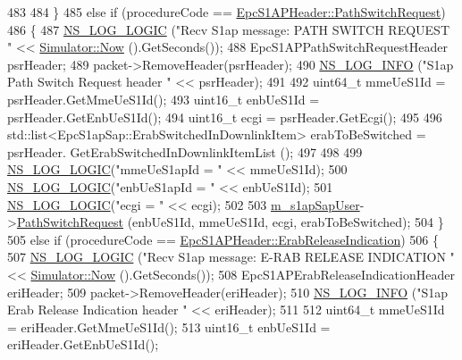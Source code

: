 \begin{DoxyCode}
483 
484   \}
485   \textcolor{keywordflow}{else} \textcolor{keywordflow}{if} (procedureCode == \hyperlink{classns3_1_1EpcS1APHeader_aedd7ba8568bf04ce8960bd840712a63eaab42fb0bc4eaa2bd39ab5195f0d6a6d8}{EpcS1APHeader::PathSwitchRequest})
486   \{
487     \hyperlink{group__logging_ga88acd260151caf2db9c0fc84997f45ce}{NS\_LOG\_LOGIC} (\textcolor{stringliteral}{"Recv S1ap message: PATH SWITCH REQUEST "} << 
      \hyperlink{classns3_1_1Simulator_ac3178fa975b419f7875e7105be122800}{Simulator::Now} ().GetSeconds());
488     EpcS1APPathSwitchRequestHeader psrHeader;
489     packet->RemoveHeader(psrHeader);
490     \hyperlink{group__logging_gafbd73ee2cf9f26b319f49086d8e860fb}{NS\_LOG\_INFO} (\textcolor{stringliteral}{"S1ap Path Switch Request header "} << psrHeader);
491     
492     uint64\_t mmeUeS1Id = psrHeader.GetMmeUeS1Id();
493     uint16\_t enbUeS1Id = psrHeader.GetEnbUeS1Id();
494     uint16\_t ecgi = psrHeader.GetEcgi();
495 
496     std::list<EpcS1apSap::ErabSwitchedInDownlinkItem> erabToBeSwitched = psrHeader.
      GetErabSwitchedInDownlinkItemList ();
497 
498 
499     \hyperlink{group__logging_ga88acd260151caf2db9c0fc84997f45ce}{NS\_LOG\_LOGIC}(\textcolor{stringliteral}{"mmeUeS1apId = "} << mmeUeS1Id);
500     \hyperlink{group__logging_ga88acd260151caf2db9c0fc84997f45ce}{NS\_LOG\_LOGIC}(\textcolor{stringliteral}{"enbUeS1apId = "} << enbUeS1Id);
501     \hyperlink{group__logging_ga88acd260151caf2db9c0fc84997f45ce}{NS\_LOG\_LOGIC}(\textcolor{stringliteral}{"ecgi = "} << ecgi);
502 
503     \hyperlink{classns3_1_1EpcS1apMme_ab9994a301789a31ce3c324f80266619b}{m\_s1apSapUser}->\hyperlink{classns3_1_1EpcS1apSapMme_ac82413022edee64f336cf3804ad6184d}{PathSwitchRequest} (enbUeS1Id, mmeUeS1Id, ecgi, 
      erabToBeSwitched);
504   \}
505   \textcolor{keywordflow}{else} \textcolor{keywordflow}{if} (procedureCode == \hyperlink{classns3_1_1EpcS1APHeader_aedd7ba8568bf04ce8960bd840712a63eacba9fcdd89b080f9511a1de3dea78cf0}{EpcS1APHeader::ErabReleaseIndication})
506   \{
507    \hyperlink{group__logging_ga88acd260151caf2db9c0fc84997f45ce}{NS\_LOG\_LOGIC} (\textcolor{stringliteral}{"Recv S1ap message: E-RAB RELEASE INDICATION "} << 
      \hyperlink{classns3_1_1Simulator_ac3178fa975b419f7875e7105be122800}{Simulator::Now} ().GetSeconds());
508     EpcS1APErabReleaseIndicationHeader eriHeader;
509     packet->RemoveHeader(eriHeader);
510     \hyperlink{group__logging_gafbd73ee2cf9f26b319f49086d8e860fb}{NS\_LOG\_INFO} (\textcolor{stringliteral}{"S1ap Erab Release Indication header "} << eriHeader);
511     
512     uint64\_t mmeUeS1Id = eriHeader.GetMmeUeS1Id();
513     uint16\_t enbUeS1Id = eriHeader.GetEnbUeS1Id();

\end{DoxyCode}
